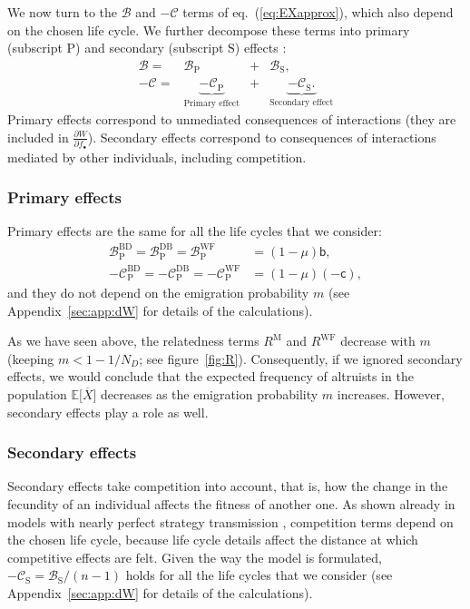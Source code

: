 \documentclass[11pt, letterpaper]{article}
\renewcommand{\eqref}[1]{\textup{{\normalfont eq.~(\ref{#1}}\normalfont)}}
\newcommand{\derivn}[2]{\frac{\partial #1}{\partial #2}}
\newcommand{\Esp}[1]{\mathbb{E}\big[ #1\big]}%
\newcommand{\appname}[0]{Appendix}
\newcommand{\bb}{\mathsf{b}}
\newcommand{\cc}{\mathsf{c}}
\newcommand{\Moran}{\textrm{M}}
\newcommand{\BD}{\textrm{BD}}
\newcommand{\DB}{\textrm{DB}}
\newcommand{\WF}{\textrm{WF}}
\newcommand{\focal}{\bullet}
\newcommand{\prim}{\textrm{P}}
\newcommand{\secd}{\textrm{S}}
\newcommand{\ndemes}{N_D}
\begin{document}
We now turn to the $\mathcal{B}$ and $-\mathcal{C}$ terms of \eqref{eq:EXapprox}, which also depend on the chosen life cycle. We further decompose these terms into primary (subscript $\prim$) and secondary (subscript $\secd$) effects \citep{WestGardner2010}: 
\begin{equation}
\begin{array}{rccc}
\mathcal{B} =&  \mathcal{B}_{\prim} &+& \mathcal{B}_{\secd},\\
-\mathcal{C} =& \underbrace{-\mathcal{C}_{\prim}}_{\textrm{Primary effect}} &+& \underbrace{-\mathcal{C}_{\secd}.}_{\textrm{Secondary effect}}
%
\end{array}
\end{equation} 
%
Primary effects correspond to unmediated consequences of interactions (they are included in $\derivn{W}{f_{\focal}}$). Secondary effects correspond to consequences of interactions mediated by other individuals, including competition. 


\subsubsection*{Primary effects}
%
Primary effects are the same for all the life cycles that we consider:
\begin{subequations}
\begin{align}
\mathcal{B}_{\prim}^{\BD} = \mathcal{B}_{\prim}^{\DB} = \mathcal{B}_{\prim}^{\WF} &= (1-\mu) \bb, \\
-\mathcal{C}_{\prim}^{\BD} = -\mathcal{C}_{\prim}^{\DB} = -\mathcal{C}_{\prim}^{\WF} &= (1-\mu) (-\cc),
\end{align}
\end{subequations}
%
and they do not depend on the emigration probability $m$ (see \appname~\ref{sec:app:dW} for details of the calculations). 

As we have seen above, the relatedness terms $R^{\Moran}$ and $R^{\WF}$ decrease with $m$ (keeping $m<1 - 1/\ndemes$; see figure~\ref{fig:R}). Consequently, if we ignored secondary effects, we would conclude that the expected frequency of altruists in the population $\Esp{\overline{X}}$ decreases as the emigration probability $m$ increases. However, secondary effects play a role as well.

\subsubsection*{Secondary effects}

Secondary effects take competition into account, that is, how the change in the fecundity of an individual affects the fitness of another one. As shown already in models with nearly perfect strategy transmission \citep{GrafenArchetti2008}, competition terms depend on the chosen life cycle, because life cycle details affect the distance at which competitive effects are felt. Given the way the model is formulated, $-\mathcal{C}_{\secd} = \mathcal{B}_{\secd}/(n-1)$ holds for all the life cycles that we consider (see \appname~\ref{sec:app:dW} for details of the calculations). 
\end{document}
